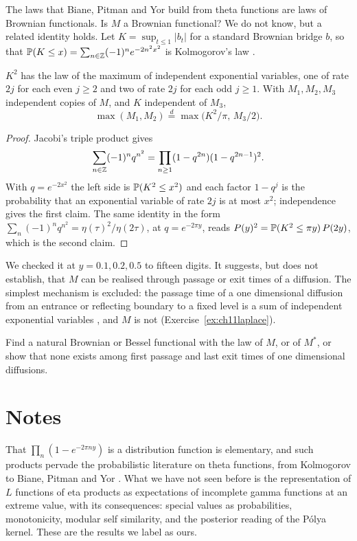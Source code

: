 The laws that Biane, Pitman and Yor \cite{bpy2001} build from theta functions are laws of Brownian functionals. Is $M$ a Brownian functional? We do not know, but a related identity holds. Let $K=\sup_{t\le1}|b_t|$ for a standard Brownian bridge $b$, so that $\mathbb{P}(K\le x)=\sum_{n\in\mathbb{Z}}(-1)^ne^{-2n^2x^2}$ is Kolmogorov's law \cite{kolmogorov1933}.

\begin{proposition}\label{prop:ch11kolmogorov}
$K^2$ has the law of the maximum of independent exponential variables, one of rate $2j$ for each even $j\ge2$ and two of rate $2j$ for each odd $j\ge1$. With $M_1,M_2,M_3$ independent copies of $M$, and $K$ independent of $M_3$,
\[
\max(M_1,M_2)\overset{d}{=}\max\bigl(K^2/\pi,\,M_3/2\bigr).
\]
\end{proposition}

\begin{proof}
Jacobi's triple product gives
\[
\sum_{n\in\mathbb{Z}}(-1)^nq^{n^2}=\prod_{n\ge1}(1-q^{2n})(1-q^{2n-1})^2.
\]
With $q=e^{-2x^2}$ the left side is $\mathbb{P}(K^2\le x^2)$ and each factor $1-q^j$ is the probability that an exponential variable of rate $2j$ is at most $x^2$; independence gives the first claim. The same identity in the form $\sum_n(-1)^nq^{n^2}=\eta(\tau)^2/\eta(2\tau)$, at $q=e^{-2\pi y}$, reads $P(y)^2=\mathbb{P}(K^2\le\pi y)\,P(2y)$, which is the second claim.
\end{proof}

We checked it at $y=0.1,0.2,0.5$ to fifteen digits. It suggests, but does not establish, that $M$ can be realised through passage or exit times of a diffusion. The simplest mechanism is excluded: the passage time of a one dimensional diffusion from an entrance or reflecting boundary to a fixed level is a sum of independent exponential variables \cite{kent1980}, and $M$ is not (Exercise~\ref{ex:ch11laplace}).

\begin{problem}\label{prob:ch11brownian}
Find a natural Brownian or Bessel functional with the law of $M$, or of $M^*$, or show that none exists among first passage and last exit times of one dimensional diffusions.
\end{problem}

\section{Notes}

That $\prod_n(1-e^{-2\pi ny})$ is a distribution function is elementary, and such products pervade the probabilistic literature on theta functions, from Kolmogorov \cite{kolmogorov1933} to Biane, Pitman and Yor \cite{bpy2001}. What we have not seen before is the representation of $L$ functions of eta products as expectations of incomplete gamma functions at an extreme value, with its consequences: special values as probabilities, monotonicity, modular self similarity, and the posterior reading of the P\'olya kernel. These are the results we label as ours.

